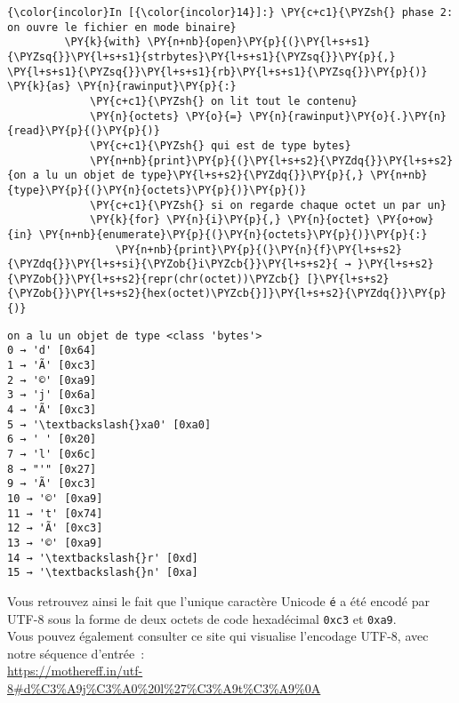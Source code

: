     \begin{Verbatim}[commandchars=\\\{\}]
{\color{incolor}In [{\color{incolor}14}]:} \PY{c+c1}{\PYZsh{} phase 2: on ouvre le fichier en mode binaire}
         \PY{k}{with} \PY{n+nb}{open}\PY{p}{(}\PY{l+s+s1}{\PYZsq{}}\PY{l+s+s1}{strbytes}\PY{l+s+s1}{\PYZsq{}}\PY{p}{,} \PY{l+s+s1}{\PYZsq{}}\PY{l+s+s1}{rb}\PY{l+s+s1}{\PYZsq{}}\PY{p}{)} \PY{k}{as} \PY{n}{rawinput}\PY{p}{:}
             \PY{c+c1}{\PYZsh{} on lit tout le contenu}
             \PY{n}{octets} \PY{o}{=} \PY{n}{rawinput}\PY{o}{.}\PY{n}{read}\PY{p}{(}\PY{p}{)}
             \PY{c+c1}{\PYZsh{} qui est de type bytes}
             \PY{n+nb}{print}\PY{p}{(}\PY{l+s+s2}{\PYZdq{}}\PY{l+s+s2}{on a lu un objet de type}\PY{l+s+s2}{\PYZdq{}}\PY{p}{,} \PY{n+nb}{type}\PY{p}{(}\PY{n}{octets}\PY{p}{)}\PY{p}{)}
             \PY{c+c1}{\PYZsh{} si on regarde chaque octet un par un}
             \PY{k}{for} \PY{n}{i}\PY{p}{,} \PY{n}{octet} \PY{o+ow}{in} \PY{n+nb}{enumerate}\PY{p}{(}\PY{n}{octets}\PY{p}{)}\PY{p}{:}
                 \PY{n+nb}{print}\PY{p}{(}\PY{n}{f}\PY{l+s+s2}{\PYZdq{}}\PY{l+s+si}{\PYZob{}i\PYZcb{}}\PY{l+s+s2}{ → }\PY{l+s+s2}{\PYZob{}}\PY{l+s+s2}{repr(chr(octet))\PYZcb{} [}\PY{l+s+s2}{\PYZob{}}\PY{l+s+s2}{hex(octet)\PYZcb{}]}\PY{l+s+s2}{\PYZdq{}}\PY{p}{)}
\end{Verbatim}


    \begin{Verbatim}[commandchars=\\\{\}]
on a lu un objet de type <class 'bytes'>
0 → 'd' [0x64]
1 → 'Ã' [0xc3]
2 → '©' [0xa9]
3 → 'j' [0x6a]
4 → 'Ã' [0xc3]
5 → '\textbackslash{}xa0' [0xa0]
6 → ' ' [0x20]
7 → 'l' [0x6c]
8 → "'" [0x27]
9 → 'Ã' [0xc3]
10 → '©' [0xa9]
11 → 't' [0x74]
12 → 'Ã' [0xc3]
13 → '©' [0xa9]
14 → '\textbackslash{}r' [0xd]
15 → '\textbackslash{}n' [0xa]

    \end{Verbatim}

    Vous retrouvez ainsi le fait que l'unique caractère Unicode \texttt{é} a
été encodé par UTF-8 sous la forme de deux octets de code hexadécimal
\texttt{0xc3} et \texttt{0xa9}.\\

    Vous pouvez également consulter ce site qui visualise l'encodage UTF-8,
avec notre séquence d'entrée~:\\

\href{https://mothereff.in/utf-8\#d\%C3\%A9j\%C3\%A0\%20l\%27\%C3\%A9t\%C3\%A9\%0A}{https://mothereff.in/utf-8\#d\%C3\%A9j\%C3\%A0\%20l\%27\%C3\%A9t\%C3\%A9\%0A}

